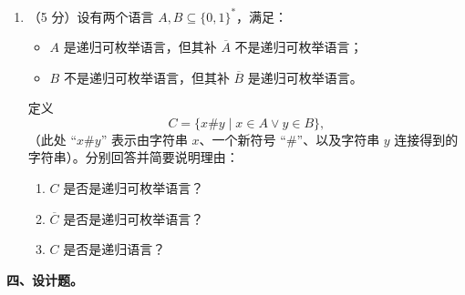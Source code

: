 \documentclass[UTF8,zihao=5]{ctexart}
\newcommand{\examheading}[1]{\par\medskip\noindent\textbf{#1。}\par}
\begin{document}
\begin{enumerate}[start=15]
  \item （5 分）设有两个语言 $A,B\subseteq\{0,1\}^*$，满足：
  \begin{itemize}
    \item $A$ 是递归可枚举语言，但其补 $\overline{A}$ 不是递归可枚举语言；
    \item $B$ 不是递归可枚举语言，但其补 $\overline{B}$ 是递归可枚举语言。
  \end{itemize}
  定义
  \[
    C=\{x\#y\mid x\in A\vee y\in B\},
  \]
  （此处 ``$x\#y$'' 表示由字符串 $x$、一个新符号 ``$\#$''、以及字符串 $y$ 连接得到的字符串）。分别回答并简要说明理由：
  \begin{enumerate}[label=(\arabic*)]
    \item $C$ 是否是递归可枚举语言？
    \item $\overline{C}$ 是否是递归可枚举语言？
    \item $C$ 是否是递归语言？
  \end{enumerate}
\end{enumerate}

\newpage
\examheading{四、设计题}
\end{document}

